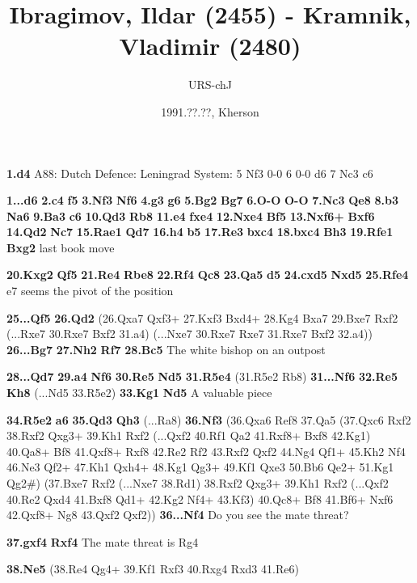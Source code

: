 \documentclass{article}
\title{Ibragimov, Ildar (2455) - Kramnik, Vladimir (2480)}
\date{1991.??.??, Kherson}
\author{URS-chJ}
\begin{document}
\begin{multicols}{2}
\maketitle
\newchessgame\textbf{1.}\textbf{d4} \newline A88: Dutch Defence: Leningrad System: 5 Nf3 0-0 6 0-0 d6 7 Nc3 c6 \par \textbf{1...}\textbf{d6} \textbf{2.}\textbf{c4} \textbf{f5} \textbf{3.}\textbf{Nf3} \textbf{Nf6} \textbf{4.}\textbf{g3} \textbf{g6} \textbf{5.}\textbf{Bg2} \textbf{Bg7} \textbf{6.}\textbf{O-O} \textbf{O-O} \textbf{7.}\textbf{Nc3} \textbf{Qe8} \textbf{8.}\textbf{b3} \textbf{Na6} \textbf{9.}\textbf{Ba3} \textbf{c6} \textbf{10.}\textbf{Qd3} \textbf{Rb8} \textbf{11.}\textbf{e4} \textbf{fxe4} \textbf{12.}\textbf{Nxe4} \textbf{Bf5} \textbf{13.}\textbf{Nxf6+} \textbf{Bxf6} \textbf{14.}\textbf{Qd2} \textbf{Nc7} \textbf{15.}\textbf{Rae1} \textbf{Qd7} \textbf{16.}\textbf{h4} \textbf{b5} \textbf{17.}\textbf{Re3} \textbf{bxc4} \textbf{18.}\textbf{bxc4} \textbf{Bh3} \textbf{19.}\textbf{Rfe1} \textbf{Bxg2} \newline last book move \par \textbf{20.}\textbf{Kxg2} \textbf{Qf5} \textbf{21.}\textbf{Re4} \textbf{Rbe8} \textbf{22.}\textbf{Rf4} \textbf{Qc8} \textbf{23.}\textbf{Qa5} \textbf{d5} \textbf{24.}\textbf{cxd5} \textbf{Nxd5} \textbf{25.}\textbf{Rfe4} \newline e7 seems the pivot of the position \par \textbf{25...}\textbf{Qf5} \textbf{26.}\textbf{Qd2} (26.Qxa7 Qxf3+ 27.Kxf3 Bxd4+ 28.Kg4 Bxa7 29.Bxe7 Rxf2 (...Rxe7 30.Rxe7 Bxf2 31.a4) (...Nxe7 30.Rxe7 Rxe7 31.Rxe7 Bxf2 32.a4)) \textbf{26...}\textbf{Bg7} \textbf{27.}\textbf{Nh2} \textbf{Rf7} \textbf{28.}\textbf{Bc5} \newline The white bishop on an outpost \par \textbf{28...}\textbf{Qd7} \textbf{29.}\textbf{a4} \textbf{Nf6} \textbf{30.}\textbf{Re5} \textbf{Nd5} \textbf{31.}\textbf{R5e4} (31.R5e2 Rb8) \textbf{31...}\textbf{Nf6} \textbf{32.}\textbf{Re5} \textbf{Kh8} (...Nd5 33.R5e2) \textbf{33.}\textbf{Kg1} \textbf{Nd5} \newline A valuable piece \par \textbf{34.}\textbf{R5e2} \textbf{a6} \textbf{35.}\textbf{Qd3} \textbf{Qh3} (...Ra8) \textbf{36.}\textbf{Nf3} (36.Qxa6 Ref8 37.Qa5 (37.Qxc6 Rxf2 38.Rxf2 Qxg3+ 39.Kh1 Rxf2 (...Qxf2 40.Rf1 Qa2 41.Rxf8+ Bxf8 42.Kg1) 40.Qa8+ Bf8 41.Qxf8+ Rxf8 42.Re2 Rf2 43.Rxf2 Qxf2 44.Ng4 Qf1+ 45.Kh2 Nf4 46.Ne3 Qf2+ 47.Kh1 Qxh4+ 48.Kg1 Qg3+ 49.Kf1 Qxe3 50.Bb6 Qe2+ 51.Kg1 Qg2\#) (37.Bxe7 Rxf2 (...Nxe7 38.Rd1) 38.Rxf2 Qxg3+ 39.Kh1 Rxf2 (...Qxf2 40.Re2 Qxd4 41.Bxf8 Qd1+ 42.Kg2 Nf4+ 43.Kf3) 40.Qc8+ Bf8 41.Bf6+ Nxf6 42.Qxf8+ Ng8 43.Qxf2 Qxf2)) \textbf{36...}\textbf{Nf4} \newline Do you see the mate threat? \par \textbf{37.}\textbf{gxf4} \textbf{Rxf4} \newline The mate threat is Rg4 \par \textbf{38.}\textbf{Ne5} (38.Re4 Qg4+ 39.Kf1 Rxf3 40.Rxg4 Rxd3 41.Re6) 
\end{multicols}
\end{document}

